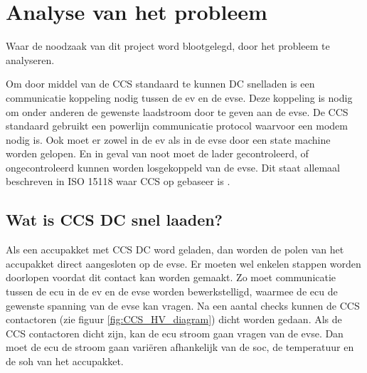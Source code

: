 \chapter{Analyse van het probleem}
\label{Analyse_van_het_probleem}

\begin{center}
    \begin{minipage}{0.5\textwidth}
        \begin{small}
            Waar de noodzaak van dit project word blootgelegd, door het probleem te analyseren.
        \end{small} 
    \end{minipage}
    \vspace{0.5cm}
\end{center}

Om door middel van de CCS standaard te kunnen DC snelladen is een communicatie
koppeling nodig tussen de \ac{ev} en de \ac{evse}. Deze koppeling is nodig om
onder anderen de gewenste laadstroom door te geven aan de \ac{evse}. De CCS
standaard gebruikt een powerlijn communicatie protocol waarvoor een \ac{modem}
nodig is. Ook moet er zowel in de \ac{ev} als in de \ac{evse} door een state
machine worden gelopen. En in geval van noot moet de lader gecontroleerd, of
ongecontroleerd kunnen worden losgekoppeld van de \ac{evse}. Dit staat
allemaal beschreven in ISO 15118 waar CCS op gebaseer is \cite{15118}.

\section{Wat is CCS DC snel laaden?}

Als een accupakket met CCS DC word geladen, dan worden de polen van het
accupakket direct aangesloten op de \ac{evse}. Er moeten wel enkelen stappen
worden doorlopen voordat dit contact kan worden gemaakt. Zo moet communicatie
tussen de \ac{ecu} in de \ac{ev} en de \ac{evse} worden bewerkstelligd, waarmee
de \ac{ecu} de gewenste spanning van de \ac{evse} kan vragen. Na een aantal
checks kunnen de CCS contactoren (zie figuur \ref{fig:CCS_HV_diagram}) dicht
worden gedaan. Als de CCS contactoren dicht zijn, kan de \ac{ecu} stroom gaan
vragen van de \ac{evse}. Dan moet de \ac{ecu} de stroom gaan variëren
afhankelijk van de \ac{soc}, de temperatuur en de \ac{soh} van het accupakket.

